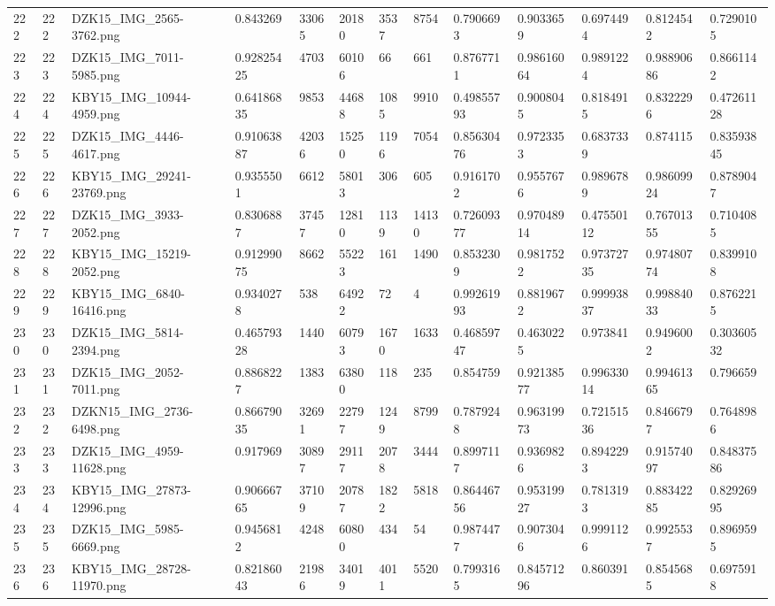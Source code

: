 \documentclass[11pt, a4paper, twoside]{report}
\begin{document}
\begin{longtable}[c]{@{}lllllllllllll@{}}
222 & 222 & DZK15\_IMG\_2565-3762.png & 0.843269 & 33065 & 20180 & 3537 & 8754 & 0.7906693 & 0.9033659 & 0.6974494 & 0.8124542 & 0.7290105 \\
223 & 223 & DZK15\_IMG\_7011-5985.png & 0.92825425 & 4703 & 60106 & 66 & 661 & 0.8767711 & 0.98616064 & 0.9891224 & 0.98890686 & 0.8661142 \\
224 & 224 & KBY15\_IMG\_10944-4959.png & 0.64186835 & 9853 & 44688 & 1085 & 9910 & 0.49855793 & 0.9008045 & 0.8184915 & 0.8322296 & 0.47261128 \\
225 & 225 & DZK15\_IMG\_4446-4617.png & 0.91063887 & 42036 & 15250 & 1196 & 7054 & 0.85630476 & 0.9723353 & 0.6837339 & 0.874115 & 0.83593845 \\
226 & 226 & KBY15\_IMG\_29241-23769.png & 0.9355501 & 6612 & 58013 & 306 & 605 & 0.9161702 & 0.9557676 & 0.9896789 & 0.98609924 & 0.8789047 \\
227 & 227 & DZK15\_IMG\_3933-2052.png & 0.8306887 & 37457 & 12810 & 1139 & 14130 & 0.72609377 & 0.97048914 & 0.47550112 & 0.76701355 & 0.7104085 \\
228 & 228 & KBY15\_IMG\_15219-2052.png & 0.91299075 & 8662 & 55223 & 161 & 1490 & 0.8532309 & 0.9817522 & 0.97372735 & 0.97480774 & 0.8399108 \\
229 & 229 & KBY15\_IMG\_6840-16416.png & 0.9340278 & 538 & 64922 & 72 & 4 & 0.99261993 & 0.8819672 & 0.99993837 & 0.99884033 & 0.8762215 \\
230 & 230 & DZK15\_IMG\_5814-2394.png & 0.46579328 & 1440 & 60793 & 1670 & 1633 & 0.46859747 & 0.4630225 & 0.973841 & 0.9496002 & 0.30360532 \\
231 & 231 & DZK15\_IMG\_2052-7011.png & 0.8868227 & 1383 & 63800 & 118 & 235 & 0.854759 & 0.92138577 & 0.99633014 & 0.99461365 & 0.796659 \\
232 & 232 & DZKN15\_IMG\_2736-6498.png & 0.86679035 & 32691 & 22797 & 1249 & 8799 & 0.7879248 & 0.96319973 & 0.72151536 & 0.8466797 & 0.7648986 \\
233 & 233 & DZK15\_IMG\_4959-11628.png & 0.917969 & 30897 & 29117 & 2078 & 3444 & 0.8997117 & 0.9369826 & 0.8942293 & 0.91574097 & 0.84837586 \\
234 & 234 & KBY15\_IMG\_27873-12996.png & 0.90666765 & 37109 & 20787 & 1822 & 5818 & 0.86446756 & 0.95319927 & 0.7813193 & 0.88342285 & 0.82926995 \\
235 & 235 & DZK15\_IMG\_5985-6669.png & 0.9456812 & 4248 & 60800 & 434 & 54 & 0.9874477 & 0.9073046 & 0.9991126 & 0.9925537 & 0.8969595 \\
236 & 236 & KBY15\_IMG\_28728-11970.png & 0.82186043 & 21986 & 34019 & 4011 & 5520 & 0.7993165 & 0.84571296 & 0.860391 & 0.8545685 & 0.6975918 \\

\end{longtable}
\end{document}
